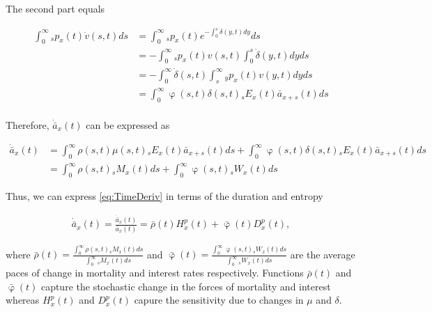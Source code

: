 \documentclass[12pt]{article}
\begin{document}
The second part equals

\begin{equation}\label{eq:TimeDerivP2}
\begin{split}
\int_0^\infty {}_sp_x(t) \dot{v}(s,t)ds &= \int_0^\infty {}_sp_x(t)  e^{-\int_0^{s}\dot{\delta}(y,t)dy}ds\\
&= -\int_0^\infty {}_sp_x(t) v(s,t) \int_0^{s}\dot{\delta}(y,t)dy ds\\
&= -\int_0^\infty  \dot{\delta}(s,t)\int_s^{\infty} {}_yp_x(t) v(y,t) dy ds\\
&= \int_0^\infty  \upvarphi(s,t) \delta(s,t)  {}_sE_x(t) \bar{a} _{x+s}(t) ds\\
\end{split}
\end{equation}


Therefore, $\dot{\bar{a}} _x(t)$ can be expressed as


\begin{equation}\label{eq:TimeDerivP3}
\begin{split}
\dot{\bar{a}}_{x}(t) &=  \int_0^\infty \rho(s,t) \mu(s,t){}_sE_x(t) \bar{a}_{x+s}(t) ds +\int_0^\infty  \upvarphi(s,t) \delta(s,t)  {}_sE_x(t) \bar{a}_{x+s}(t) ds\\
&= \int_0^\infty \rho(s,t) {}_sM_x(t)  ds +\int_0^\infty  \upvarphi(s,t) {}_sW_x(t)  ds
\end{split}
\end{equation}

Thus, we can express \ref{eq:TimeDeriv} in terms of the duration and entropy


\begin{equation}\label{eq:TimeDerivP}
\begin{split}
 \acute{\bar{a}}_x(t) = \frac{\dot{\bar{a}}_x(t)}{\bar{a}_x(t)}  = \bar{\rho}(t){H}^{p}_x(t)+\bar{\upvarphi}(t){D}^{p}_x(t),
\end{split}
\end{equation}

where $\bar{\rho}(t)= \frac{\int_0^\infty \rho(s,t) {}_sM_x(t)  ds}{\int_0^\infty  {}_sM_x(t)ds}$ and 
$\bar{\upvarphi}(t)= \frac{\int_0^\infty \upvarphi(s,t) {}_sW_x(t)  ds}{\int_0^\infty {}_sW_x(t) ds}$ are the average paces of change in mortality and interest rates respectively. Functions $\bar{\rho}(t)$ and $\bar{\upvarphi}(t)$ capture the stochastic change in the forces of mortality and interest whereas ${H}^{p}_x(t)$ and ${D}^{p}_x(t)$ capure the sensitivity due to changes in $\mu$ and $\delta$.
\end{document}
